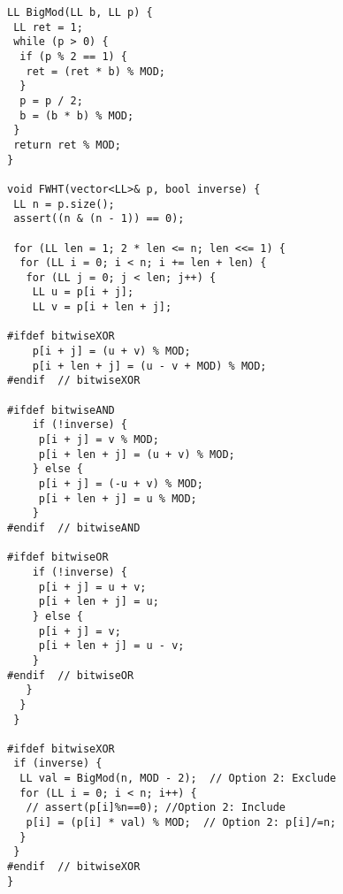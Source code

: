 \documentclass[a4paper,11pt,oneside]{article}
\begin{document}
\begin{multicols*}{\COLS}
\begin{lstlisting}
LL BigMod(LL b, LL p) {
 LL ret = 1;
 while (p > 0) {
  if (p % 2 == 1) {
   ret = (ret * b) % MOD;
  }
  p = p / 2;
  b = (b * b) % MOD;
 }
 return ret % MOD;
}

void FWHT(vector<LL>& p, bool inverse) {
 LL n = p.size();
 assert((n & (n - 1)) == 0);

 for (LL len = 1; 2 * len <= n; len <<= 1) {
  for (LL i = 0; i < n; i += len + len) {
   for (LL j = 0; j < len; j++) {
    LL u = p[i + j];
    LL v = p[i + len + j];

#ifdef bitwiseXOR
    p[i + j] = (u + v) % MOD;
    p[i + len + j] = (u - v + MOD) % MOD;
#endif  // bitwiseXOR

#ifdef bitwiseAND
    if (!inverse) {
     p[i + j] = v % MOD;
     p[i + len + j] = (u + v) % MOD;
    } else {
     p[i + j] = (-u + v) % MOD;
     p[i + len + j] = u % MOD;
    }
#endif  // bitwiseAND

#ifdef bitwiseOR
    if (!inverse) {
     p[i + j] = u + v;
     p[i + len + j] = u;
    } else {
     p[i + j] = v;
     p[i + len + j] = u - v;
    }
#endif  // bitwiseOR
   }
  }
 }

#ifdef bitwiseXOR
 if (inverse) {
  LL val = BigMod(n, MOD - 2);  // Option 2: Exclude
  for (LL i = 0; i < n; i++) {
   // assert(p[i]%n==0); //Option 2: Include
   p[i] = (p[i] * val) % MOD;  // Option 2: p[i]/=n;
  }
 }
#endif  // bitwiseXOR
}
\end{lstlisting}

\end{multicols*}
\end{document}
